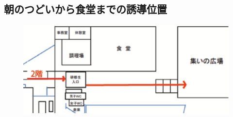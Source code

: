 \subsection{朝のつどいから食堂までの誘導位置}
\begin{figure}[h]
\begin{center}
  \includegraphics[scale=0.6]{./17/asanozu.eps}
\end{center}
\end{figure}





%
